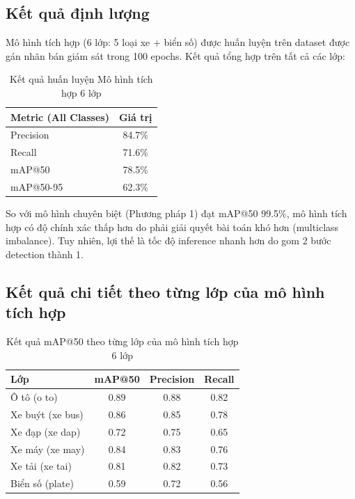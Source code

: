 \subsection{Kết quả định lượng}
Mô hình tích hợp (6 lớp: 5 loại xe + biển số) được huấn luyện trên dataset được gán nhãn bán giám sát trong 100 epochs. Kết quả tổng hợp trên tất cả các lớp:

\begin{table}[H]
\centering
\caption{Kết quả huấn luyện Mô hình tích hợp 6 lớp}
\label{tab:multiclass_results}
\begin{tabular}{|l|c|}
\hline
\textbf{Metric (All Classes)} & \textbf{Giá trị} \\ \hline
Precision & 84.7\% \\ \hline
Recall & 71.6\% \\ \hline
mAP@50 & 78.5\% \\ \hline
mAP@50-95 & 62.3\% \\ \hline
\end{tabular}
\end{table}

So với mô hình chuyên biệt (Phương pháp 1) đạt mAP@50 99.5\%, mô hình tích hợp có độ chính xác thấp hơn do phải giải quyết bài toán khó hơn (multiclass imbalance). Tuy nhiên, lợi thế là tốc độ inference nhanh hơn do gom 2 bước detection thành 1.

\subsection{Kết quả chi tiết theo từng lớp của mô hình tích hợp}

\begin{table}[H]
\centering
\caption{Kết quả mAP@50 theo từng lớp của mô hình tích hợp 6 lớp}
\label{tab:multiclass_per_class}
\begin{tabular}{|l|c|c|c|}
\hline
\textbf{Lớp} & \textbf{mAP@50} & \textbf{Precision} & \textbf{Recall} \\ \hline
Ô tô (o to) & 0.89 & 0.88 & 0.82 \\ \hline
Xe buýt (xe bus) & 0.86 & 0.85 & 0.78 \\ \hline
Xe đạp (xe dap) & 0.72 & 0.75 & 0.65 \\ \hline
Xe máy (xe may) & 0.84 & 0.83 & 0.76 \\ \hline
Xe tải (xe tai) & 0.81 & 0.82 & 0.73 \\ \hline
Biển số (plate) & 0.59 & 0.72 & 0.56 \\ \hline
\end{tabular}
\end{table}


